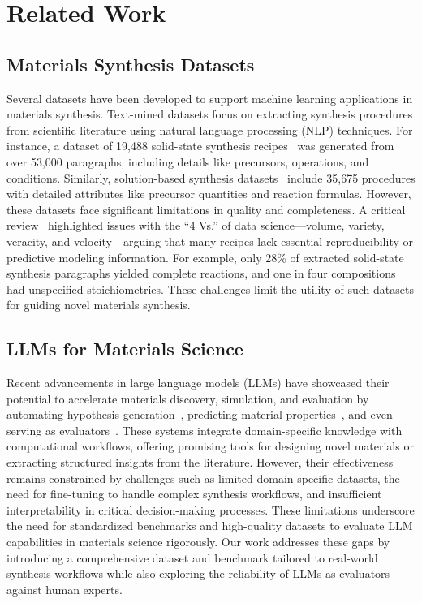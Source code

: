 \section{Related Work}

\subsection{Materials Synthesis Datasets}

Several datasets have been developed to support machine learning applications in materials synthesis. Text-mined datasets focus on extracting synthesis procedures from scientific literature using natural language processing (NLP) techniques. For instance, a dataset of 19,488 solid-state synthesis recipes~\cite{kononova2019text} was generated from over 53,000 paragraphs, including details like precursors, operations, and conditions. Similarly, solution-based synthesis datasets~\cite{wang2022dataset} include 35,675 procedures with detailed attributes like precursor quantities and reaction formulas. However, these datasets face significant limitations in quality and completeness. A critical review~\cite{sun2025critical} highlighted issues with the ``4 Vs.'' of data science—volume, variety, veracity, and velocity—arguing that many recipes lack essential reproducibility or predictive modeling information. For example, only 28\% of extracted solid-state synthesis paragraphs yielded complete reactions, and one in four compositions had unspecified stoichiometries. These challenges limit the utility of such datasets for guiding novel materials synthesis.


\subsection{LLMs for Materials Science}

Recent advancements in large language models (LLMs) have showcased their potential to accelerate materials discovery, simulation, and evaluation by automating hypothesis generation~\cite{kumbhar2025hypothesisgenerationmaterialsdiscovery}, predicting material properties~\cite{chiang2024llamplargelanguagemodel}, and even serving as evaluators~\cite{mishra2024llamat}. These systems integrate domain-specific knowledge with computational workflows, offering promising tools for designing novel materials or extracting structured insights from the literature. However, their effectiveness remains constrained by challenges such as limited domain-specific datasets, the need for fine-tuning to handle complex synthesis workflows, and insufficient interpretability in critical decision-making processes. These limitations underscore the need for standardized benchmarks and high-quality datasets to evaluate LLM capabilities in materials science rigorously. Our work addresses these gaps by introducing a comprehensive dataset and benchmark tailored to real-world synthesis workflows while also exploring the reliability of LLMs as evaluators against human experts.


